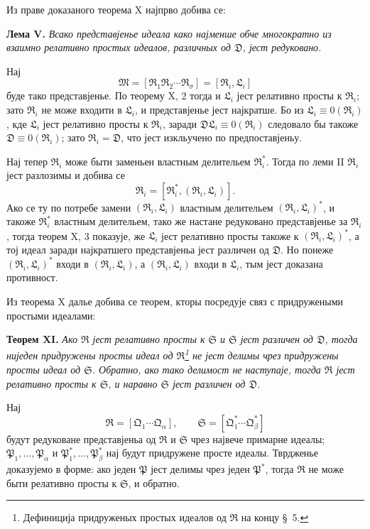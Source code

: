 ﻿\documentclass[11pt]{article}
\newcommand{\ideal}[1]{\mathfrak{#1}}
\begin{document}
Из праве доказаного теорема X најпрво добива се:

\textbf{Лема V.} \emph{Всако представјенье идеала како најменше обче многократно из взаимно релативно простых идеалов, различных од \(\ideal D\), јест редуковано.}

Нај
\[
 \ideal M=[\ideal R_1\ideal R_2\cdots\ideal R_\sigma]=[\ideal R_i,\ideal L_i]
\]
буде тако представјенье. По теорему X, 2 тогда и \(\ideal L_i\) јест релативно просты к \(\ideal R_i\); зато \(\ideal R_i\) не може входити в \(\ideal L_i\), и представјенье јест најкратше. Бо из \(\ideal L_i\equiv0(\ideal R_i)\), кде \(\ideal L_i\) јест релативно просты к \(\ideal R_i\), заради \(\ideal D\ideal L_i\equiv0(\ideal R_i)\) следовало бы такоже \(\ideal D\equiv0(\ideal R_i)\); зато \(\ideal R_i=\ideal D\), что јест изкльучено по предпоставјеньу.

Нај тепер \(\ideal R_i\) може быти заменьен властным делительем \(\ideal R_i^*\). Тогда по леми II \(\ideal R_i\) јест разлозимы и добива се
\[
 \ideal R_i=[\ideal R_i^*,(\ideal R_i,\ideal L_i)].
\]
Ако се ту по потребе замени \((\ideal R_i,\ideal L_i)\) властным делительем \((\ideal R_i,\ideal L_i)^*\), и такоже \(\ideal R_i^*\) властным делительем, тако же настане редуковано представјенье за \(\ideal R_i\), тогда теорем X, 3 показује, же \(\ideal L_i\) јест релативно просты такоже к \((\ideal R_i,\ideal L_i)^*\), а тој идеал заради најкратшего представјеньа јест различен од \(\ideal D\). Но понеже \((\ideal R_i,\ideal L_i)^*\) входи в \((\ideal R_i,\ideal L_i)\), а \((\ideal R_i,\ideal L_i)\) входи в \(\ideal L_i\), тым јест доказана противност.

Из теорема X далье добива се теорем, кторы посредује связ с придружеными простыми идеалами:

\textbf{Теорем XI.} \emph{Ако \(\ideal R\) јест релативно просты к \(\ideal S\) и \(\ideal S\) јест различен од \(\ideal D\), тогда ниједен придружены просты идеал од \(\ideal R\)\footnote{Дефиниција придруженых простых идеалов од \(\ideal R\) на концу \S~5.} не јест делимы чрез придружены просты идеал од \(\ideal S\). Обратно, ако тако делимост не наступаје, тогда \(\ideal R\) јест релативно просты к \(\ideal S\), и наравно \(\ideal S\) јест различен од \(\ideal D\).}

Нај
\[
 \ideal R=[\ideal Q_1\cdots\ideal Q_\alpha],\qquad
 \ideal S=[\ideal Q_1^*\cdots\ideal Q_\beta^*]
\]
будут редуковане представјеньа од \(\ideal R\) и \(\ideal S\) чрез највече примарне идеалы; \(\ideal P_1,\ldots,\ideal P_\alpha\) и \(\ideal P_1^*,\ldots,\ideal P_\beta^*\) нај будут придружене просте идеалы. Тврдженье доказујемо в форме: ако једен \(\ideal P\) јест делимы чрез једен \(\ideal P^*\), тогда \(\ideal R\) не може быти релативно просты к \(\ideal S\), и обратно.
\end{document}
